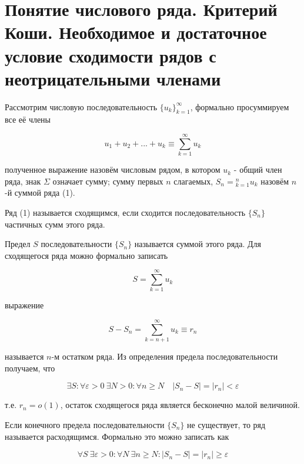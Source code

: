 \section{Понятие числового ряда. Критерий Коши. Необходимое и достаточное условие сходимости рядов с неотрицательными членами}

Рассмотрим числовую последовательность $\{u_k\}_{k=1}^\infty$, формально просуммируем все её члены

\begin{equation}
	u_1 + u_2 + ... + u_k \equiv \displaystyle\sum_{k = 1}^\infty u_k
\end{equation}

полученное выражение назовём числовым рядом, в котором $u_k$ - общий член ряда, знак $\Sigma$ означает сумму; сумму первых $n$ слагаемых, $S_n = \displaystyle_{k = 1}^n u_k$ назовём $n$-й суммой ряда (1).

\begin{definition}
	Ряд (1) называется сходящимся, если сходится последовательность $\{S_n\}$ частичных сумм этого ряда.
\end{definition}

Предел $S$ последовательности $\{S_n\}$ называется суммой этого ряда. Для сходящегося ряда можно формально записать

\begin{equation*}
	S = \displaystyle\sum_{k  = 1}^\infty u_k
\end{equation*}

выражение

\begin{equation*}
	S - S_n = \displaystyle\sum_{k = n + 1}^\infty u_k \equiv r_n
\end{equation*}

называется $n$-м остатком ряда. Из определения предела последовательности получаем, что

\begin{equation*}
	\exists S: \forall\varepsilon > 0\: \exists N > 0: \forall n \geqslant N\quad |S_n - S| = |r_n| < \varepsilon
\end{equation*}

т.е. $r_n = o(1)$, остаток сходящегося ряда является бесконечно малой величиной.

Если конечного предела последовательности $\{S_n\}$ не существует, то ряд называется расходящимся. Формально это можно записать как

\begin{equation*}
	\forall S \: \exists\varepsilon > 0: \forall N \: \exists n \geqslant N: |S_n - S| = |r_n| \geqslant \varepsilon
\end{equation*}

